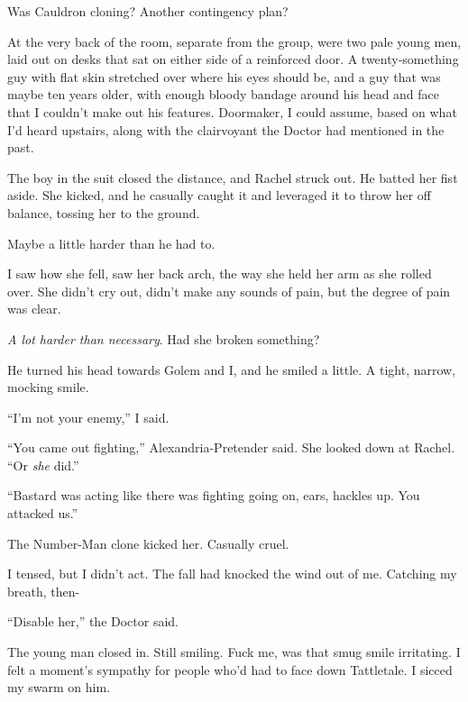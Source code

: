 Was Cauldron cloning?  Another contingency plan?



At the very back of the room, separate from the group, were two pale young men, laid out on desks that sat on either side of a reinforced door.  A twenty-something guy with flat skin stretched over where his eyes should be, and a guy that was maybe ten years older, with enough bloody bandage around his head and face that I couldn't make out his features.  Doormaker, I could assume, based on what I'd heard upstairs, along with the clairvoyant the Doctor had mentioned in the past.



The boy in the suit closed the distance, and Rachel struck out.  He batted her fist aside.  She kicked, and he casually caught it and leveraged it to throw her off balance, tossing her to the ground.



Maybe a little harder than he had to.



I saw how she fell, saw her back arch, the way she held her arm as she rolled over.  She didn't cry out, didn't make any sounds of pain, but the degree of pain was clear.



\emph{A lot harder than necessary}.  Had she broken something?



He turned his head towards Golem and I, and he smiled a little.  A tight, narrow, mocking smile.



``I'm not your enemy,'' I said.



``You came out fighting,'' Alexandria-Pretender said.  She looked down at Rachel.  ``Or \emph{she} did.''



``Bastard was acting like there was fighting going on, ears, hackles up.  You attacked us.''



The Number-Man clone kicked her.  Casually cruel.



I tensed, but I didn't act.  The fall had knocked the wind out of me.  Catching my breath, then-



``Disable her,'' the Doctor said.



The young man closed in.  Still smiling.  Fuck me, was that smug smile irritating.  I felt a moment's sympathy for people who'd had to face down Tattletale.  I sicced my swarm on him.



